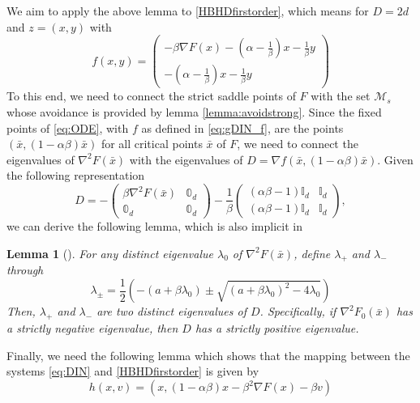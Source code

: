 \documentclass[reqno]{amsart}
\theoremstyle{plain}
\newtheorem{lemma}{Lemma}	%
\theoremstyle{definition}
\theoremstyle{remark}
\begin{document}
We aim to apply the above lemma to \eqref{HBHDfirstorder}, which means for $D=2d$ and $z=(x,y)$ with
\begin{equation}
\label{eq:gDIN_f}
    f(x,y) = 
	\begin{pmatrix}
	    - \beta\nabla F(x) - \left(\alpha-\frac{1}{\beta}\right)x - \frac{1}{\beta}y \\
		- \left(\alpha-\frac{1}{\beta}\right)x - \frac{1}{\beta}y
	\end{pmatrix}
\end{equation}
To this end, we need to connect the strict saddle points of $F$ with the set $\mathcal{M}_s$ whose avoidance is provided by lemma \ref{lemma:avoidstrong}. 
Since the fixed points of \eqref{eq:ODE}, with $f$ as defined in \eqref{eq:gDIN_f}, are the points $(\bar{x},(1-\alpha\beta)\bar{x})$ for all critical points $\bar{x}$ of $F$, we need to connect the eigenvalues of $\nabla^2 F(\bar{x})$ with the eigenvalues of $D=\nabla f(\bar{x},(1-\alpha\beta)\bar{x})$. 
Given the following representation
\begin{equation}
    D = 
    -
    \begin{pmatrix}
        \beta\nabla^2F(\bar{x}) & \mathbb{0}_d \\ 
        \mathbb{0}_d & \mathbb{0}_d
    \end{pmatrix}
    - \frac{1}{\beta}
    \begin{pmatrix}
        \left( \alpha\beta - 1 \right)\mathbb{I}_d & \mathbb{I}_d \\ 
        \left( \alpha\beta - 1 \right)\mathbb{I}_d & \mathbb{I}_d 
    \end{pmatrix},
\end{equation} 
we can derive the following lemma, which is also implicit in \cite{castera2023inertial}
\begin{lemma}[\cite{castera2023inertial}]
\label{lmm:eigenvalues}
    For any distinct eigenvalue $\lambda_0$ of $\nabla^2F(\bar{x})$, define $\lambda_+$ and $\lambda_-$ through
    \begin{equation}
        \lambda_{\pm} = \frac{1}{2} \left( -(a+\beta\lambda_0) \pm \sqrt{(a+\beta\lambda_0)^2 -4\lambda_0} \right)
    \end{equation}
    Then, $\lambda_+$ and $\lambda_-$ are two distinct eigenvalues of $D$. 
    Specifically, if $\nabla^2F_0(\bar{x})$ has a strictly negative eigenvalue, then $D$ has a strictly positive eigenvalue.
\end{lemma}

Finally, we need the following lemma which shows that the mapping between the systems \eqref{eq:DIN} and \eqref{HBHDfirstorder} is given by
\begin{equation}
\label{eq:mapping}
    h(x,v) = (x,(1-\alpha\beta)x - \beta^2\nabla F(x) - \beta v)
\end{equation}
\end{document}
